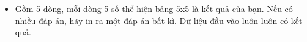 \begin{itemize}
	\item Gồm 5 dòng, mỗi dòng 5 số thể hiện bảng 5x5 là kết quả của bạn. Nếu có nhiều đáp án, hãy in ra một đáp án bất kì. Dữ liệu đầu vào luôn luôn có kết quả.
\end{itemize}

\